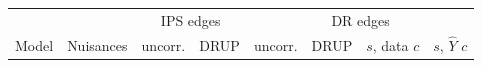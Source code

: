 \begin{tabular}{llcccccc}
\toprule
 & & \multicolumn{2}{c}{IPS edges} & \multicolumn{4}{c}{DR edges}\\
Model & Nuisances & uncorr. & DRUP & uncorr. & DRUP & $s$, data $c$ & $s$, $\hat Y$ $c$\\
\bottomrule
\end{tabular}
